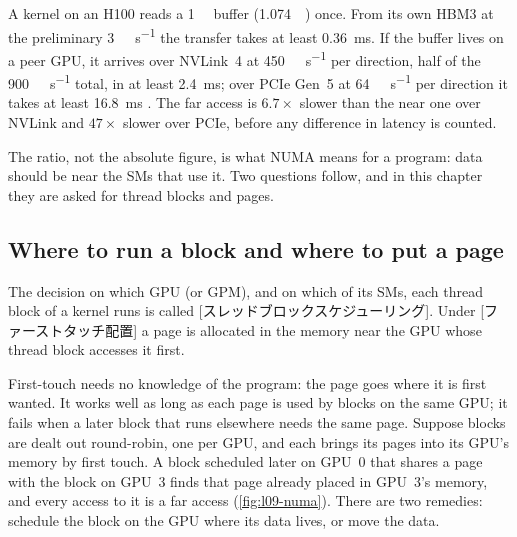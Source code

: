 \documentclass[../main.tex]{subfiles}
\begin{document}
\begin{example}
  \label{ex:l09-near-far}
  A kernel on an H100 reads a \SI{1}{\gibi\byte} buffer
  (\SI{1.074}{\giga\byte}) once.  From its own HBM3 at the preliminary
  \SI{3}{\tera\byte\per\second} the transfer takes at least
  \SI{0.36}{\milli\second}.  If the buffer lives on a peer GPU, it
  arrives over NVLink~4 at \SI{450}{\giga\byte\per\second} per direction,
  half of the \SI{900}{\giga\byte\per\second} total, in at least
  \SI{2.4}{\milli\second}; over PCIe Gen~5 at
  \SI{64}{\giga\byte\per\second} per direction it takes at least
  \SI{16.8}{\milli\second} \cite{nvidia2022hopper}.  The far access is
  $6.7\times$ slower than the near one over NVLink and $47\times$ slower
  over PCIe, before any difference in latency is counted.
\end{example}

%
The ratio, not the absolute figure, is what NUMA means for a program:
data should be near the SMs that use it.  Two questions follow, and in
this chapter they are asked for thread blocks and pages.

\subsection{Where to run a block and where to put a page}

\begin{definition}
  The decision on which GPU (or GPM), and on which of its SMs, each
  thread block of a kernel runs is called
  [スレッドブロックスケジューリング].  Under
  [ファーストタッチ配置] a page is
  allocated in the memory near the GPU whose thread block accesses it
  first.
\end{definition}

First-touch needs no knowledge of the program: the page goes where it is
first wanted.  It works well as long as each page is used by blocks on
the same GPU; it fails when a later block that runs elsewhere needs the
same page.  Suppose blocks are dealt out round-robin, one per GPU, and
each brings its pages into its GPU's memory by first touch.  A block
scheduled later on GPU~0 that shares a page with the block on GPU~3
finds that page already placed in GPU~3's memory, and every access to it
is a far access (\cref{fig:l09-numa}).  There are two remedies: schedule
the block on the GPU where its data lives, or move the data.
\end{document}

